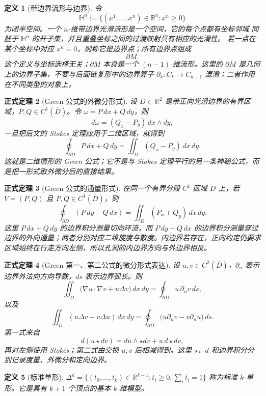 \documentclass[UTF8,fontset=none,a4paper,11pt]{ctexart}
\theoremstyle{foundation-definition}
\newtheorem{definition}{定义}[section]
\theoremstyle{foundation-theorem}
\newtheorem{theorem}[definition]{正式定理}
\theoremstyle{foundation-proposition}
\theoremstyle{foundation-example}
\theoremstyle{foundation-remark}
\theoremstyle{foundation-theorem}
\begin{document}
\begin{definition}[带边界流形与边界]\label{def:manifold-with-boundary}
令
\[
\mathbb H^n:=\{(x^1,\ldots,x^n)\in\mathbb R^n:x^n\ge0\}
\]
为闭半空间。一个 \(n\)-维带边界光滑流形是一个空间，它的每个点都有坐标邻域
同胚于 \(\mathbb H^n\) 的开子集，并且重叠坐标之间的过渡映射具有相应的光滑性。
若一点在某个坐标中对应 \(x^n=0\)，则称它是边界点；所有边界点组成
\[
\partial M.
\]
这个定义与坐标选择无关；\(\partial M\) 本身是一个 \((n-1)\)-维流形。这里的
\(\partial M\) 是几何上的边界子集，不要与后面链复形中的边界算子
\(\partial_k:C_k\to C_{k-1}\) 混淆；二者作用在不同类型的对象上。
\end{definition}

\begin{theorem}[Green 公式的外微分形式]\label{thm:green-circulation}
设 \(D\subset\mathbb R^2\) 是带正向光滑边界的有界区域，\(P,Q\in C^1(\overline D)\)。令 \(\omega=P\,dx+Q\,dy\)，则
\[
d\omega=(Q_x-P_y)\,dx\wedge dy,
\]
一旦把后文的 Stokes 定理应用于二维区域，就得到
\[
\oint_{\partial D}P\,dx+Q\,dy
=\iint_D(Q_x-P_y)\,dx\,dy.
\]
这就是二维情形的 Green 公式；它不是与 Stokes 定理平行的另一条神秘公式，而是把一形式取外微分后的直接结果。
\end{theorem}

\begin{theorem}[Green 公式的通量形式]\label{thm:green-flux}
在同一个有界分段 \(C^1\) 区域 \(D\) 上，若 \(V=(P,Q)\) 且 \(P,Q\in C^1(\overline D)\)，则
\[
\oint_{\partial D}(P\,dy-Q\,dx)
=\iint_D(P_x+Q_y)\,dx\,dy.
\]
这里 \(P\,dx+Q\,dy\) 的边界积分测量切向环流，而 \(P\,dy-Q\,dx\) 的边界积分测量穿过边界的外向通量；两者分别对应二维旋度与散度。内边界若存在，正向约定仍要求区域始终在行走方向左侧，所以孔洞的内边界方向与外边界相反。
\end{theorem}

\begin{theorem}[Green 第一、第二公式的微分形式表达]\label{thm:green-first-second}
设 \(u,v\in C^2(\overline D)\)，\(\partial_n\) 表示边界外法向方向导数，\(ds\) 表示边界弧长。则
\[
\iint_D\bigl(\nabla u\cdot\nabla v+u\Delta v\bigr)\,dx\,dy
=\oint_{\partial D}u\,\partial_nv\,ds,
\]
以及
\[
\iint_D(u\Delta v-v\Delta u)\,dx\,dy
=\oint_{\partial D}
\bigl(u\partial_nv-v\partial_nu\bigr)\,ds.
\]
第一式来自
\[
d(u\star dv)=du\wedge\star dv+u\,d\star dv,
\]
再对左侧使用 Stokes；第二式由交换 \(u,v\) 后相减得到。这里 \(\star\)、\(d\) 和边界积分分别记录度量、外微分和定向边界。
\end{theorem}

\begin{definition}[标准单形]\label{def:standard-simplex}
\(\Delta^k=\{(t_0,\dots,t_k)\in\mathbb R^{k+1}:t_i\geq0,\sum_i t_i=1\}\) 称为标准 \(k\)-单形。它是具有 \(k+1\) 个顶点的基本 \(k\)-维模型。
\end{definition}
\end{document}
